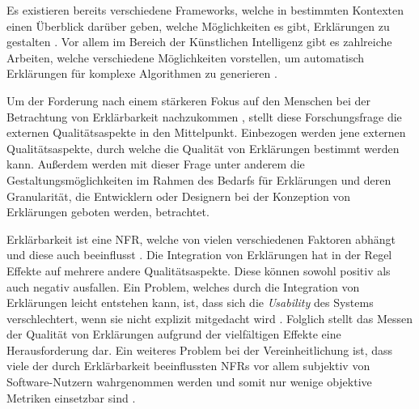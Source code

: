 \smallskip

\noindent{}

\smallskip

Es existieren bereits verschiedene Frameworks, welche in bestimmten Kontexten einen Überblick darüber geben, welche Möglichkeiten es gibt, Erklärungen zu gestalten \cite{nunes_systematic_2017}. Vor allem im Bereich der Künstlichen Intelligenz gibt es zahlreiche Arbeiten, welche verschiedene Möglichkeiten vorstellen, um automatisch Erklärungen für komplexe Algorithmen zu generieren \cite{sokol_explainability_2020, mahoney2019framework}.

Um der Forderung nach einem stärkeren Fokus auf den Menschen bei der Betrachtung von Erklärbarkeit nachzukommen \cite{ehsan_operationalizing_2021}, stellt diese Forschungsfrage die externen Qualitätsaspekte \cite{international2011iso} in den Mittelpunkt. Einbezogen werden jene externen Qualitätsaspekte, durch welche die Qualität von Erklärungen bestimmt werden kann. Außerdem werden mit dieser Frage unter anderem die Gestaltungsmöglichkeiten im Rahmen des Bedarfs für Erklärungen und deren Granularität, die Entwicklern oder Designern bei der Konzeption von Erklärungen geboten werden, betrachtet. 


\smallskip

\noindent{}

\smallskip

Erklärbarkeit ist eine NFR, welche von vielen verschiedenen Faktoren abhängt und diese auch beeinflusst \cite{chazette_knowledge_nodate}. Die Integration von Erklärungen hat in der Regel Effekte auf mehrere andere Qualitätsaspekte. Diese können sowohl positiv als auch negativ ausfallen. Ein Problem, welches durch die Integration von Erklärungen leicht entstehen kann, ist, dass sich die \textit{Usability} des Systems verschlechtert, wenn sie nicht explizit mitgedacht wird \cite{sokol_explainability_2020}. Folglich stellt das Messen der Qualität von Erklärungen aufgrund der vielfältigen Effekte eine Herausforderung dar. Ein weiteres Problem bei der Vereinheitlichung ist, dass viele der durch Erklärbarkeit beeinflussten NFRs vor allem subjektiv von Software-Nutzern wahrgenommen werden und somit nur wenige objektive Metriken einsetzbar sind \cite{sokol_explainability_2020}.

